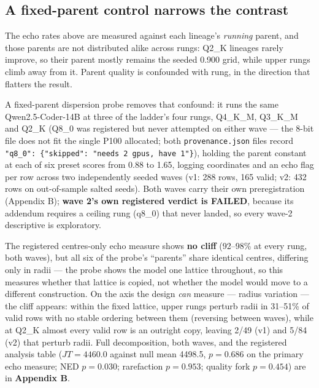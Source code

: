 \subsection{A fixed-parent control narrows the contrast}

The echo rates above are measured against each lineage's \emph{running} parent, and those parents are not distributed alike across rungs: Q2\_K lineages rarely improve, so their parent mostly remains the seeded 0.900 grid, while upper rungs climb away from it. Parent quality is confounded with rung, in the direction that flatters the result.

A fixed-parent dispersion probe removes that confound: it runs the same Qwen2.5-Coder-14B at three of the ladder's four rungs, Q4\_K\_M, Q3\_K\_M and Q2\_K (Q8\_0 was registered but never attempted on either wave --- the 8-bit file does not fit the single P100 allocated; both \texttt{provenance.json} files record \texttt{"q8\_0": \{"skipped": "needs 2 gpus, have 1"\}}), holding the parent constant at each of six preset scores from 0.88 to 1.65, logging coordinates and an echo flag per row across two independently seeded waves (v1: 288 rows, 165 valid; v2: 432 rows on out-of-sample salted seeds). Both waves carry their own preregistration (Appendix B); \textbf{wave 2's own registered verdict is FAILED}, because its addendum requires a ceiling rung (q8\_0) that never landed, so every wave-2 descriptive is exploratory.

The registered centres-only echo measure shows \textbf{no cliff} (92--98\% at every rung, both waves), but all six of the probe's ``parents'' share identical centres, differing only in radii --- the probe shows the model one lattice throughout, so this measures whether that lattice is copied, not whether the model would move to a different construction. On the axis the design \emph{can} measure --- radius variation --- the cliff appears: within the fixed lattice, upper rungs perturb radii in 31--51\% of valid rows with no stable ordering between them (reversing between waves), while at Q2\_K almost every valid row is an outright copy, leaving 2/49 (v1) and 5/84 (v2) that perturb radii. Full decomposition, both waves, and the registered analysis table ($JT = 4460.0$ against null mean 4498.5, $p = 0.686$ on the primary echo measure; NED $p = 0.030$; rarefaction $p = 0.953$; quality fork $p = 0.454$) are in \textbf{Appendix B}.

